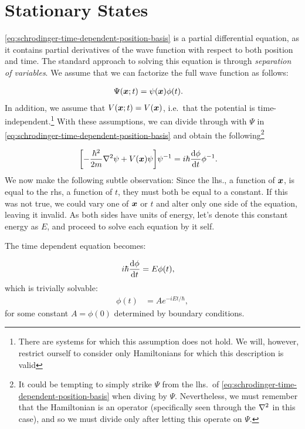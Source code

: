 \documentclass[Thesis.tex]{subfiles}
\begin{document}
\section{Stationary States}

\autoref{eq:schrodinger-time-dependent-position-basis} is a partial differential equation,
as it contains partial derivatives of the wave function with respect to both position and
time. The standard approach to solving this equation is through \emph{separation of
variables}. We assume that we can factorize the full wave function as follows:

\begin{align}
    \Psi(\bm{x}; t) &= \psi(\bm{x})\phi(t).\label{eq:separatable-wave-func-def}
\end{align}
%
In addition, we assume that $V(\bm{x}; t) = V(\bm{x})$, i.e.\ that the potential is
time-independent.\footnote{There are systems for which this assumption does not hold. We
will, however, restrict ourself to consider only Hamiltonians for which this description
is valid} With these assumptions, we can divide through with $\Psi$ in
\autoref{eq:schrodinger-time-dependent-position-basis} and obtain the
following\footnote{It could be tempting to simply strike $\Psi$ from the lhs.\ of
\autoref{eq:schrodinger-time-dependent-position-basis} when diving by $\Psi$. Nevertheless, we
must remember that the Hamiltonian is an operator (specifically seen through the
$\laplacian$ in this case), and so we must divide only after letting this operate on
$\Psi$.}

\begin{align}
    \qty[- \frac{\hbar^2}{2m} \laplacian \psi + V(\vb x)\psi]\psi^{-1} &=
    i\hbar\dv{\phi}{t} \phi^{-1}.
\end{align}
%
We now make the following subtle observation: Since the lhs., a function of $\bm{x}$, is
equal to the rhs, a function of $t$, they must both be equal to a constant. If
this was not true, we could vary one of $\bm{x}$ or $t$ and alter only one side of
the equation, leaving it invalid.
As both sides have units of energy, let's denote this constant energy as $E$, and proceed
to solve each equation by it self.

The time dependent equation becomes:

\begin{align}
    i\hbar \dv{\phi}{t} &= E\phi(t),
\end{align}
which is trivially solvable:
\begin{align}
    \phi(t) &= Ae^{-iEt/\hbar},
\end{align}
for some constant $A=\phi(0)$ determined by boundary conditions.
\end{document}
